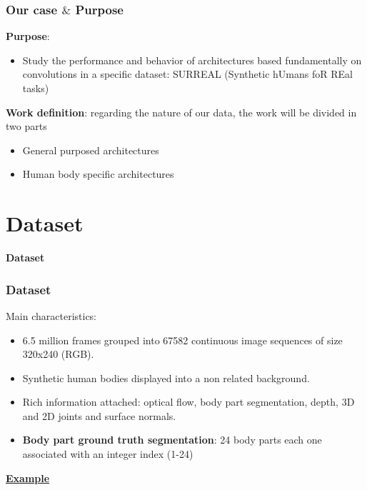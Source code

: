 \documentclass{beamer}
\begin{document}
\begin{frame}
\frametitle{Our case $\&$ Purpose}

\textbf{Purpose}:

\begin{itemize}
\item Study the performance and behavior of architectures based fundamentally on convolutions in a specific dataset: SURREAL (Synthetic hUmans foR REal tasks)
\end{itemize}

\textbf{Work definition}: regarding the nature of our data, the work will be divided in two parts
\begin{itemize}
\item General purposed architectures
\item Human body specific architectures
\end{itemize}

\end{frame}

\section{Dataset}
\begin{frame}
\huge{\centerline{\textbf{Dataset}}}
\end{frame}


\begin{frame}
\frametitle{Dataset}

Main characteristics:

\begin{itemize}
\item 6.5 million frames grouped into 67582 continuous image sequences of size 320x240 (RGB).
\item Synthetic human bodies displayed into a non related background.
\item Rich information attached: optical flow, body part segmentation, depth, 3D and
2D joints and surface normals.
\item \textbf{Body part ground truth segmentation}: 24 body parts each one associated with an integer index (1-24)
\end{itemize}
\begin{center}
\href{run:01_01_c0008.mp4}{
\textbf{Example}}
\end{center}
\end{frame}
\end{document}
